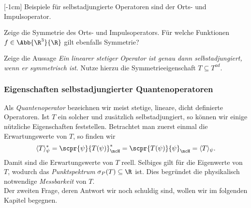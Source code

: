 \documentclass{subfiles}
\begin{document}
    [-1cm]
        Beispiele für selbstadjungierte Operatoren sind der Orts- und Impulsoperator.
        \begin{Aufgabe}
            \nr{} Zeige die Symmetrie des Orts- und Impulsoperators. Für welche Funktionen $f\in\Abb{\R^3}{\R}$ gilt ebenfalls Symmetrie?
            
            \nr{} Zeige die Aussage \textit{Ein linearer stetiger Operator ist genau dann selbstadjungiert, wenn er symmetrisch ist.} Nutze hierzu die Symmetrieeigenschaft $T\subseteq T^{\textit{ad}}$. 
        \end{Aufgabe}
    \subsubsection*{Eigenschaften selbstadjungierter Quantenoperatoren}
        Als \emph{Quantenoperator} bezeichnen wir meist stetige, lineare, dicht definierte Operatoren. Ist $T$ ein solcher und zusätzlich selbstadjungiert, so können wir einige nützliche Eigenschaften feststellen. Betrachtet man zuerst einmal die Erwartungswerte von $T$, so finden wir 
        \[\langle T\rangle_\psi^* = \scpr{\psi}{T(\psi)}_\mcH^* = \scpr{T(\psi)}{\psi}_\mcH = \langle T\rangle_\psi.\]
        Damit sind die Erwartungswerte von $T$ reell. Selbiges gilt für die Eigenwerte von $T$, wodurch das \emph{Punktspektrum} $\sigma_P(T)\subseteq\R$ ist. Dies begründet die physikalisch notwendige \emph{Messbarkeit} von $T$. \\

        Der zweiten Frage, deren Antwort wir noch schuldig sind, wollen wir im folgenden Kapitel begegnen. 
\end{document}
